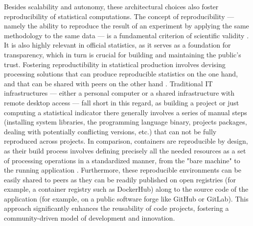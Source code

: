 
Besides scalability and autonomy, these architectural choices also foster reproducibility of statistical computations. The concept of reproducibility — namely the ability to reproduce the result of an experiment by applying the same methodology to the same data — is a fundamental criterion of scientific validity \cite{mcnutt2014reproducibility}. It is also highly relevant in official statistics, as it serves as a foundation for transparency, which in turn is crucial for building and maintaining the public's trust. Fostering reproductibility in statistical production involves devising processing solutions that can produce reproducible statistics on the one hand, and that can be shared with peers on the other hand \cite{ntts2019reproducibility}. Traditional IT infrastructures — either a personal computer or a shared infrastructure with remote desktop access — fall short in this regard, as building a project or just computing a statistical indicator there generally involves a series of manual steps (installing system libraries, the programming language binary, projects packages, dealing with potentially conflicting versions, etc.) that can not be fully reproduced across projects. In comparison, containers are reproducible by design, as their build process involves defining precisely all the needed resources as a set of processing operations in a standardized manner, from the "bare machine" to the running application \cite{moreau2023containers}. Furthermore, these reproducible environments can be easily shared to peers as they can be readily published on open registries (for example, a container registry such as DockerHub) along to the source code of the application (for example, on a public software forge like GitHub or GitLab). This approach significantly enhances the reusability of code projects, fostering a community-driven model of development and innovation.
